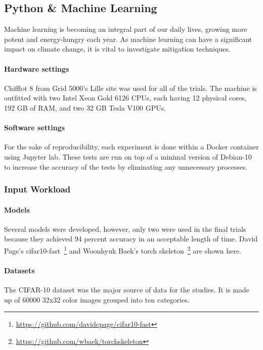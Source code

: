 
\subsection{Python \& Machine Learning}
Machine learning is becoming an integral part of our daily lives, growing more potent and energy-hungry each year.
As machine learning can have a significant impact on climate change, it is vital to investigate mitigation techniques.

\paragraph{Hardware settings}
Chifflot 8 from Grid 5000's Lille site was used for all of the trials.
The machine is outfitted with two Intel Xeon Gold 6126 CPUs, each having 12 physical cores, 192 GB of RAM, and two 32 GB Tesla V100 GPUs.

\paragraph{Software settings}
For the sake of reproducibility, each experiment is done within a Docker container using Jupyter lab. These tests are run on top of a minimal version of Debian-10 to increase the accuracy of the tests by eliminating any unnecessary processes.


\subsubsection{Input Workload}
\paragraph{Models}
Several models were developed, however, only two were used in the final trials because they achieved 94 percent accuracy in an acceptable length of time.
David Page's cifar10-fast~\footnote{\url{https://github.com/davidcpage/cifar10-fast}} and Woonhyuk Baek's torch skeleton~\footnote{\url{https://github.com/wbaek/torchskeleton}} are shown here.

\paragraph{Datasets}
The CIFAR-10 dataset was the major source of data for the studies.
It is made up of 60000 32x32 color images grouped into ten categories.

